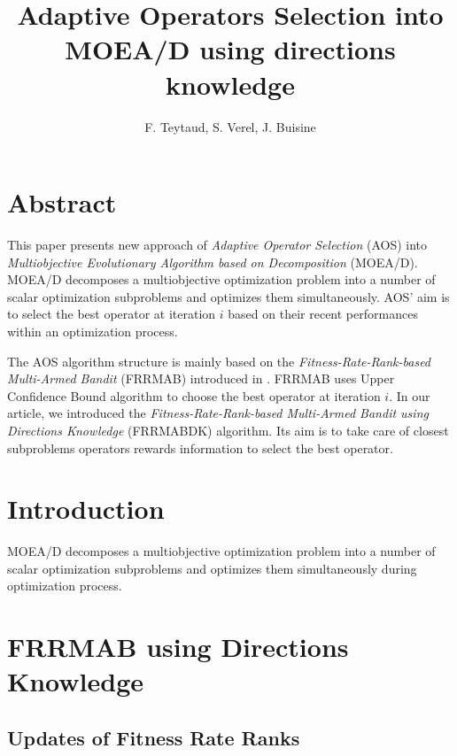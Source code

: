 \documentclass{article}
\title{\textbf{Adaptive Operators Selection into MOEA/D using directions knowledge}}
\author{F. Teytaud, S. Verel, J. Buisine}
\date{}
\begin{document}
\maketitle

\vspace{30mm}

\tableofcontents
\newpage

\section{Abstract}

This paper presents new approach of \textit{Adaptive Operator Selection} (AOS) into \textit{Multiobjective Evolutionary Algorithm based on Decomposition} (MOEA/D). MOEA/D decomposes a multiobjective optimization problem into a number of scalar optimization subproblems and optimizes them simultaneously. AOS' aim is to select the best operator at iteration $i$ based on their recent performances within an optimization process. 

\vspace{3mm}

The AOS algorithm structure is mainly based on the \textit{Fitness-Rate-Rank-based Multi-Armed Bandit} (FRRMAB) introduced in \citep{DBLP:journals/tec/LiFKZ14}. FRRMAB uses Upper Confidence Bound algorithm to choose the best operator at iteration $i$. In our article, we introduced the \textit{Fitness-Rate-Rank-based Multi-Armed Bandit using Directions Knowledge} (FRRMABDK) algorithm. Its aim is to take care of closest subproblems operators rewards information to select the best operator. 


\newpage

\section{Introduction}

MOEA/D decomposes a multiobjective optimization problem into a number of scalar optimization subproblems and optimizes them simultaneously during optimization process. 

\newpage
\section{FRRMAB using Directions Knowledge}


\subsection{Updates of Fitness Rate Ranks}
\end{document}
